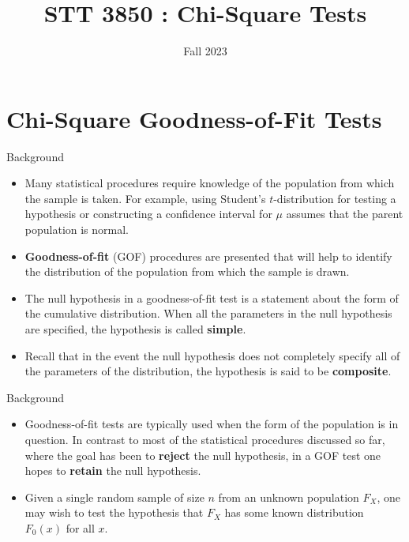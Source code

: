 \documentclass[
  ignorenonframetext,
]{beamer}
\title{STT 3850 : Chi-Square Tests}
\author{Fall 2023}
\date{}
\institute{Appalachian State University}
\begin{document}
\frame{\titlepage}

\hypertarget{chi-square-goodness-of-fit-tests}{%
\section{Chi-Square Goodness-of-Fit
Tests}\label{chi-square-goodness-of-fit-tests}}

\begin{frame}{Background}
\protect\hypertarget{background}{}
\begin{itemize}
\item
  Many statistical procedures require knowledge of the population from
  which the sample is taken. For example, using Student's
  \(t\)-distribution for testing a hypothesis or constructing a
  confidence interval for \(\mu\) assumes that the parent population is
  normal.
\item
  \textbf{Goodness-of-fit} (GOF) procedures are presented that will help
  to identify the distribution of the population from which the sample
  is drawn.
\item
  The null hypothesis in a goodness-of-fit test is a statement about the
  form of the cumulative distribution. When all the parameters in the
  null hypothesis are specified, the hypothesis is called
  \textbf{simple}.
\item
  Recall that in the event the null hypothesis does not completely
  specify all of the parameters of the distribution, the hypothesis is
  said to be \textbf{composite}.
\end{itemize}
\end{frame}

\begin{frame}{Background}
\protect\hypertarget{background-1}{}
\begin{itemize}
\item
  Goodness-of-fit tests are typically used when the form of the
  population is in question. In contrast to most of the statistical
  procedures discussed so far, where the goal has been to
  \textbf{reject} the null hypothesis, in a GOF test one hopes to
  \textbf{retain} the null hypothesis.
\item
  Given a single random sample of size \(n\) from an unknown population
  \(F_X\), one may wish to test the hypothesis that \(F_X\) has some
  known distribution \(F_0(x)\) for all \(x\).
\end{itemize}
\end{frame}
\end{document}
